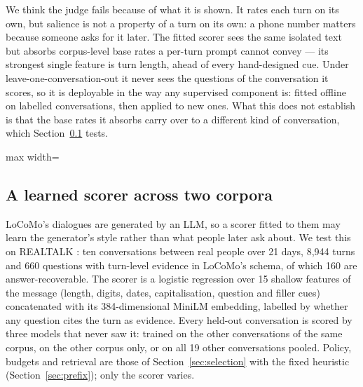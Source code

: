 We think the judge fails because of what it is shown. It rates each turn on
its own, but salience is not a property of a turn on its own: a phone number
matters because someone asks for it later. The fitted scorer sees the
same isolated text but absorbs corpus-level base rates a per-turn prompt cannot
convey --- its strongest single feature is turn length, ahead of every
hand-designed cue. Under leave-one-conversation-out it never sees the
questions of the conversation it scores, so it is deployable in the way any
supervised component is: fitted offline on labelled conversations, then
applied to new ones. What this does not establish is that the base rates it
absorbs carry over to a different kind of conversation, which
Section~\ref{sec:transfer} tests.

\begin{table}[t]
\caption{Single-component scorer swap at $S=4096$ with context 2048. Policy,
retrieval and compression are fixed and only the scorer varies. P3 is fitted
on the other nine conversations. Pre-fix run (Section~\ref{sec:prefix}).}
\label{tab:scorers}
\centering
\small
\begin{adjustbox}{max width=\columnwidth}\end{adjustbox}
\end{table}

\subsection{A learned scorer across two corpora}
\label{sec:transfer}

LoCoMo's dialogues are generated by an LLM, so a scorer fitted to them may
learn the generator's style rather than what people later ask about. We test
this on REALTALK \cite{lee2025realtalk}: ten conversations between real people
over 21 days, 8{,}944 turns and 660 questions with turn-level evidence in
LoCoMo's schema, of which 160 are answer-recoverable. The scorer is a logistic
regression over 15 shallow features of the message (length, digits, dates,
capitalisation, question and filler cues) concatenated with its 384-dimensional
MiniLM embedding, labelled by whether any question cites the turn as evidence.
Every held-out conversation is scored by three models that never saw it:
trained on the other conversations of the same corpus, on the other corpus
only, or on all 19 other conversations pooled. Policy, budgets and retrieval
are those of Section~\ref{sec:selection} with the fixed heuristic
(Section~\ref{sec:prefix}); only the scorer varies.

